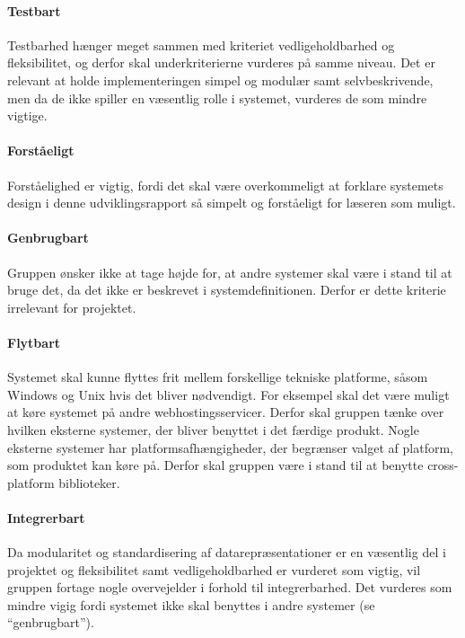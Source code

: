 \paragraph{Testbart} Testbarhed hænger meget sammen med kriteriet vedligeholdbarhed og fleksibilitet, og derfor skal underkriterierne vurderes på samme niveau. Det er relevant at holde implementeringen simpel og modulær samt selvbeskrivende, men da de ikke spiller en væsentlig rolle i systemet,  vurderes de som mindre vigtige.

\paragraph{Forståeligt} Forståelighed er vigtig, fordi det skal være overkommeligt at forklare systemets design i denne udviklingsrapport så simpelt og forståeligt for læseren som muligt.
 
\paragraph{Genbrugbart} Gruppen ønsker ikke at tage højde for, at andre systemer skal være i stand til at bruge det, da det ikke er beskrevet i systemdefinitionen. Derfor er dette kriterie irrelevant for projektet.

\paragraph{Flytbart} Systemet skal kunne flyttes frit mellem forskellige tekniske platforme, såsom Windows og Unix hvis det bliver nødvendigt. For eksempel skal det være muligt at køre systemet på andre webhostingsservicer. Derfor skal gruppen tænke over hvilken eksterne systemer, der bliver benyttet i det færdige produkt. Nogle eksterne systemer har platformsafhængigheder, der begrænser valget af platform, som produktet kan køre på. Derfor skal gruppen være i stand til at benytte cross-platform biblioteker.

\paragraph{Integrerbart} Da modularitet og standardisering af datarepræsentationer er en væsentlig del i projektet og fleksibilitet samt vedligeholdbarhed er vurderet som vigtig, vil gruppen fortage nogle overvejelder i forhold til integrerbarhed. Det vurderes som mindre vigig fordi systemet ikke skal benyttes i andre systemer (se ``genbrugbart'').